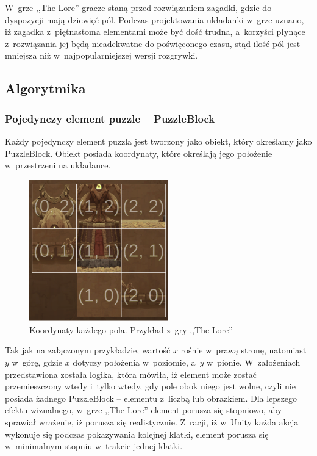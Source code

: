 \documentclass[oneside,polski,logo]{amuthesis}
\begin{document}
W~grze ,,The Lore'' gracze staną przed rozwiązaniem zagadki, gdzie do dyspozycji mają dziewięć pól. Podczas projektowania układanki w~grze uznano, iż zagadka z~piętnastoma elementami może być dość trudna, a~korzyści płynące z~rozwiązania jej będą nieadekwatne do poświęconego czasu, stąd ilość pól jest mniejsza niż w~najpopularniejszej wersji rozgrywki.
\subsection{Algorytmika}
\subsubsection{Pojedynczy element puzzle – PuzzleBlock}

\par Każdy pojedynczy element puzzla jest tworzony jako obiekt, który określamy jako PuzzleBlock. Obiekt posiada koordynaty, które określają jego położenie w~przestrzeni na układance.

\begin{figure}[h]
\centering
\includegraphics[width=6cm]{images/tyrek/coord_puzzle.png}
\caption{Koordynaty każdego pola. Przykład z~gry ,,The Lore''}
\end{figure}

Tak jak na załączonym przykładzie, wartość \(x\) rośnie w~prawą stronę, natomiast \(y\) w~górę, gdzie \(x\) dotyczy położenia w~poziomie, a~\(y\) w~pionie. W~założeniach przedstawiona została logika, która mówiła, iż element może zostać przemieszczony wtedy i~tylko wtedy, gdy pole obok niego jest wolne, czyli nie posiada żadnego PuzzleBlock – elementu z~liczbą lub obrazkiem. Dla lepszego efektu wizualnego, w~grze ,,The Lore'' element porusza się stopniowo, aby sprawiał wrażenie, iż porusza się realistycznie. Z~racji, iż w~Unity każda akcja wykonuje się podczas pokazywania kolejnej klatki, element porusza się w~minimalnym stopniu w~trakcie jednej klatki. 
\end{document}
